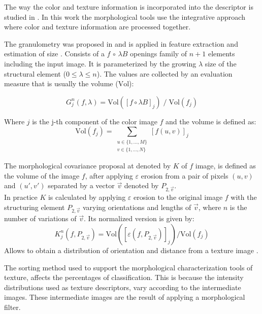 The way the color and texture information is incorporated into the descriptor is studied in \cite{palm2004color,van2005parallel}. In this work the morphological tools use the integrative approach where color and texture information are processed together.

The granulometry  was proposed in \cite{matheron1975random}  and is applied in feature extraction and estimation of size \cite{vincent2000granulometries,soille2013morphological}. Consists of a  $f \,\circ \, \lambda B $ openings family of $n+1$ elements including the input image. It is parameterized by the growing  $\lambda$ size of the structural element  ($0 \leq \lambda \leq n $). The values are collected by an evaluation measure that is usually the volume ($\mathrm{Vol}$):

\begin{equation}
G^{n}_{j}(f,\lambda)= \mathrm{Vol}([f\circ \lambda B ]_{j}) \; / \; \mathrm{Vol}(f_{j})
\end{equation}

Where $j$ is the j-th component of the color image $f$ and the volume is defined as:
\begin{equation}
\mathrm{Vol}(f_j) = \sum_{\substack{u\in \{1, ..., M\}\\ v \in \{1, ..., N\}}}[f(u,v)]_{j} 
\end{equation}

The morphological covariance proposal at \cite{matheron1975random,maragos1989pattern} denoted by  $K$ of $f$ image, is defined as the volume of the image $f$, after applying $\varepsilon$  erosion from a pair of pixels $(u,v)$ and  $(u',v')$ separated by a vector $\vec{v}$ denoted by  $P_{2,\vec{v}}$.\\
In practice $K $ is calculated by applying $\varepsilon$ erosion  to the original image $f$ with the structuring element $P_{2,\vec{v}}$ varying orientations and lengths of $\vec{v}$, where $n$ is the number of variations of $\vec{v}$. Its normalized version is given by:
\begin{equation}
K^{n}_{j}(f,P_{2,\vec{v}})  = \mathrm{Vol}([\varepsilon(f,P_{2,\vec{v}})]_{j}) / \mathrm{Vol}(f_{j})
\end{equation}
Allows to obtain a distribution of orientation and distance from a texture image \cite{aptoula2007morphological}.

The sorting method used to support the morphological characterization tools of texture, affects the percentages of classification. This is because the intensity distributions used as texture descriptors, vary according to the intermediate images. These intermediate images are the result of applying a morphological filter.

